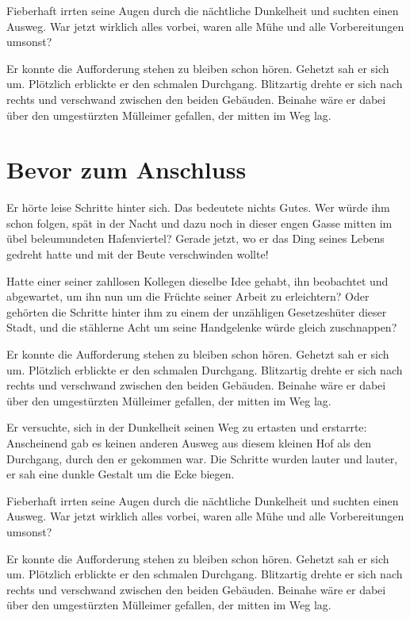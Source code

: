 \documentclass[12pt,ngerman,a4paper,DIV=9,headinclude=true,footinclude=false,titlepage=true,headsepline=true,toc=bibliography,toc=listof]{scrartcl}
\begin{document}
Fieberhaft irrten seine Augen durch die nächtliche Dunkelheit und
suchten einen Ausweg. War jetzt wirklich alles vorbei, waren alle Mühe
und alle Vorbereitungen umsonst?

Er konnte die Aufforderung stehen zu bleiben schon hören. Gehetzt sah er
sich um. Plötzlich erblickte er den schmalen Durchgang. Blitzartig
drehte er sich nach rechts und verschwand zwischen den beiden Gebäuden.
Beinahe wäre er dabei über den umgestürzten Mülleimer gefallen, der
mitten im Weg lag.

\section{Bevor zum Anschluss}\label{bevor-zum-anschluss}

Er hörte leise Schritte hinter sich. Das bedeutete nichts Gutes. Wer
würde ihm schon folgen, spät in der Nacht und dazu noch in dieser engen
Gasse mitten im übel beleumundeten Hafenviertel? Gerade jetzt, wo er das
Ding seines Lebens gedreht hatte und mit der Beute verschwinden wollte!

Hatte einer seiner zahllosen Kollegen dieselbe Idee gehabt, ihn
beobachtet und abgewartet, um ihn nun um die Früchte seiner Arbeit zu
erleichtern? Oder gehörten die Schritte hinter ihm zu einem der
unzähligen Gesetzeshüter dieser Stadt, und die stählerne Acht um seine
Handgelenke würde gleich zuschnappen?

Er konnte die Aufforderung stehen zu bleiben schon hören. Gehetzt sah er
sich um. Plötzlich erblickte er den schmalen Durchgang. Blitzartig
drehte er sich nach rechts und verschwand zwischen den beiden Gebäuden.
Beinahe wäre er dabei über den umgestürzten Mülleimer gefallen, der
mitten im Weg lag.

Er versuchte, sich in der Dunkelheit seinen Weg zu ertasten und
erstarrte: Anscheinend gab es keinen anderen Ausweg aus diesem kleinen
Hof als den Durchgang, durch den er gekommen war. Die Schritte wurden
lauter und lauter, er sah eine dunkle Gestalt um die Ecke biegen.

Fieberhaft irrten seine Augen durch die nächtliche Dunkelheit und
suchten einen Ausweg. War jetzt wirklich alles vorbei, waren alle Mühe
und alle Vorbereitungen umsonst?

Er konnte die Aufforderung stehen zu bleiben schon hören. Gehetzt sah er
sich um. Plötzlich erblickte er den schmalen Durchgang. Blitzartig
drehte er sich nach rechts und verschwand zwischen den beiden Gebäuden.
Beinahe wäre er dabei über den umgestürzten Mülleimer gefallen, der
mitten im Weg lag.
\end{document}

